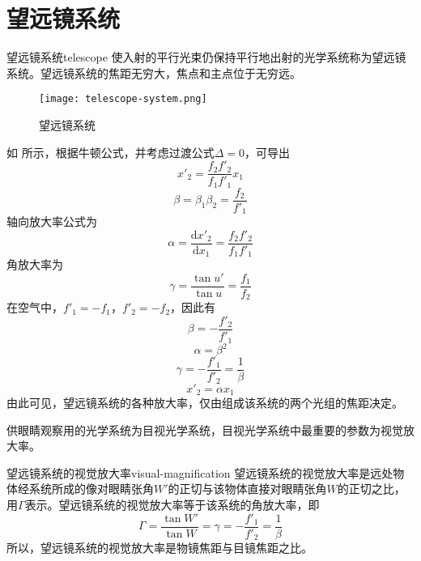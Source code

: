 \documentclass[cn,10pt,chinesefont=founder,math=newtx,cite=super,twoside]{elegantbook}
\begin{document}
\section{望远镜系统}

\begin{definition}{望远镜系统}{telescope}
	使入射的平行光束仍保持平行地出射的光学系统称为望远镜系统。望远镜系统的焦距无穷大，焦点和主点位于无穷远。
\end{definition}

\begin{figure}[htbp]
	\centering
	\texttt{[image: telescope-system.png]}
	\caption{望远镜系统}
	\label{fig:telescope-system}
\end{figure}

如 所示，根据牛顿公式，并考虑过渡公式$\varDelta=0$，可导出
\begin{equation}
x'_2=\frac{f_2f'_2}{f_1f'_1}x_1
\end{equation}
\begin{equation}
\beta=\beta_1\beta_2=\frac{f_2}{f'_1}
\end{equation}
轴向放大率公式为
\begin{equation}
\alpha=\frac{\mathrm{d}x'_2}{\mathrm{d}x_1}=\frac{f_2f'_2}{f_1f'_1}
\end{equation}
角放大率为
\begin{equation}
\gamma=\frac{\tan u'}{\tan u}=\frac{f_1}{f_2}
\end{equation}
在空气中，$f'_1=-f_1$，$f'_2=-f_2$，因此有
\begin{equation}
\beta=-\frac{f'_2}{f'_1}
\end{equation}
\begin{equation}
\alpha=\beta^2
\end{equation}
\begin{equation}
\gamma=-\frac{f'_1}{f'_2}=\frac{1}{\beta}
\end{equation}
\begin{equation}
x'_2=\alpha x_1
\end{equation}
由此可见，望远镜系统的各种放大率，仅由组成该系统的两个光组的焦距决定。

供眼睛观察用的光学系统为目视光学系统，目视光学系统中最重要的参数为视觉放大率。
\begin{definition}{望远镜系统的视觉放大率}{visual-magnification}
	望远镜系统的视觉放大率是远处物体经系统所成的像对眼睛张角$W'$的正切与该物体直接对眼睛张角$W$的正切之比，用$\varGamma$表示。望远镜系统的视觉放大率等于该系统的角放大率，即
	\begin{equation}
	\varGamma=\frac{\tan W'}{\tan W}=\gamma=-\frac{f'_1}{f'_2}=\frac{1}{\beta}
	\end{equation}
	所以，望远镜系统的视觉放大率是物镜焦距与目镜焦距之比。
\end{definition}
\end{document}
